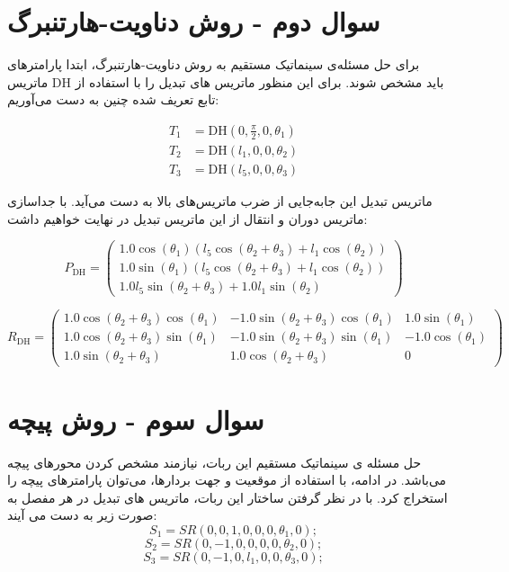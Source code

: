 \documentclass{article}
\begin{document}
\section{سوال دوم - روش دناویت-هارتنبرگ}\label{Section2}
برای حل مسئله‌ی سینماتیک مستقیم به روش دناویت-هارتنبرگ، ابتدا پارامترهای ماتریس DH باید مشخص شوند.
برای این منظور ماتریس های تبدیل را با استفاده از تابع تعریف شده چنین به دست می‌آوریم:

\[
\begin{aligned}
    T_1 &= \text{DH}(0, \frac{\pi}{2}, 0, \theta_1) \\
    T_2 &= \text{DH}(l_1, 0, 0, \theta_2) \\
    T_3 &= \text{DH}(l_5, 0, 0, \theta_3)
\end{aligned}
\]

ماتریس تبدیل این جابه‌جایی از ضرب ماتریس‌های بالا به دست می‌آید. با جداسازی ماتریس دوران و انتقال از این ماتریس تبدیل در نهایت خواهیم داشت:

\[
P_{\text{DH}} = 
\begin{pmatrix}
1.0 \cos \left(\theta_1 \right) \left(l_5 \cos \left(\theta_2 + \theta_3 \right) + l_1 \cos \left(\theta_2 \right)\right) \\
1.0 \sin \left(\theta_1 \right) \left(l_5 \cos \left(\theta_2 + \theta_3 \right) + l_1 \cos \left(\theta_2 \right)\right) \\
1.0 l_5 \sin \left(\theta_2 + \theta_3 \right) + 1.0 l_1 \sin \left(\theta_2 \right)
\end{pmatrix}
\]

\[
R_{\text{DH}} = 
\begin{pmatrix}
1.0 \cos \left(\theta_2 + \theta_3 \right) \cos \left(\theta_1 \right) & -1.0 \sin \left(\theta_2 + \theta_3 \right) \cos \left(\theta_1 \right) & 1.0 \sin \left(\theta_1 \right) \\
1.0 \cos \left(\theta_2 + \theta_3 \right) \sin \left(\theta_1 \right) & -1.0 \sin \left(\theta_2 + \theta_3 \right) \sin \left(\theta_1 \right) & -1.0 \cos \left(\theta_1 \right) \\
1.0 \sin \left(\theta_2 + \theta_3 \right) & 1.0 \cos \left(\theta_2 + \theta_3 \right) & 0
\end{pmatrix}
\]

\section{سوال سوم - روش پیچه}\label{Section3}
حل مسئله ی سینماتیک مستقیم این ربات، نیازمند مشخص کردن محورهای پیچه می‌باشد. در ادامه، با استفاده از موقعیت و جهت بردارها، می‌توان پارامترهای پیچه را استخراج کرد.
با در نظر گرفتن ساختار این ربات، ماتریس های تبدیل در هر مفصل به صورت زیر به دست می آیند:
\[
S_1 = SR(0, 0, 1, 0, 0, 0, \theta_1, 0);
\]
\[
S_2 = SR(0, -1, 0, 0, 0, 0, \theta_2, 0);
\]
\[
S_3 = SR(0, -1, 0, l_1, 0, 0, \theta_3, 0);
\]
\end{document}
